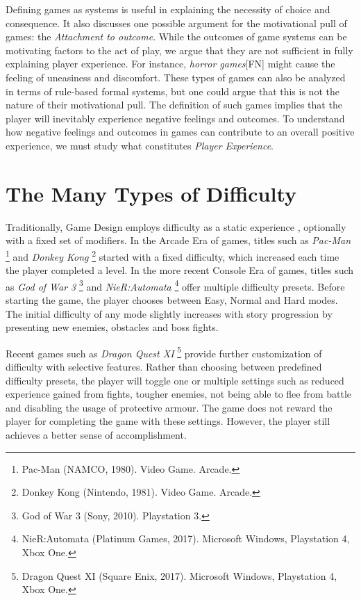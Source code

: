 Defining games as systems is useful in explaining the necessity of choice and consequence. It also discusses one possible argument for the motivational pull of games: the \emph{Attachment to outcome}.  While the outcomes of game systems can be motivating factors to the act of play, we argue that they are not sufficient in fully explaining player experience. For instance, \emph{horror games}[FN] might cause the feeling of uneasiness and discomfort. These types of games can also be analyzed in terms of rule-based formal systems, but one could argue that this is not the nature of their motivational pull. The definition of such games implies that the player will inevitably experience negative feelings and outcomes. To understand how negative feelings and outcomes in games can contribute to an overall positive experience, we must study what constitutes \emph{Player Experience}.

\section{The Many Types of Difficulty}

Traditionally, Game Design employs difficulty as a static experience \cite{article_casefordynamicdifficulty}, optionally with a fixed set of modifiers. In the Arcade Era of games, titles such as \emph{Pac-Man} \footnote{Pac-Man (NAMCO, 1980). Video Game. Arcade.} and \emph{Donkey Kong} \footnote{Donkey Kong (Nintendo, 1981). Video Game. Arcade.} started with a fixed difficulty, which increased each time the player completed a level. In the more recent Console Era of games, titles such as \emph{God of War 3} \footnote{God of War 3 (Sony, 2010). Playstation 3.} and \emph{NieR:Automata} \footnote{NieR:Automata (Platinum Games, 2017). Microsoft Windows, Playstation 4, Xbox One.} offer multiple difficulty presets. Before starting the game, the player chooses between Easy, Normal and Hard modes. The initial difficulty of any mode slightly increases with story progression by presenting new enemies, obstacles and boss fights.

Recent games such as \emph{Dragon Quest XI} \footnote{Dragon Quest XI (Square Enix, 2017). Microsoft Windows, Playstation 4, Xbox One.} provide further customization of difficulty with selective features. Rather than choosing between predefined difficulty presets, the player will toggle one or multiple settings such as reduced experience gained from fights, tougher enemies, not being able to flee from battle and disabling the usage of protective armour. The game does not reward the player for completing the game with these settings. However, the player still achieves a better sense of accomplishment.

